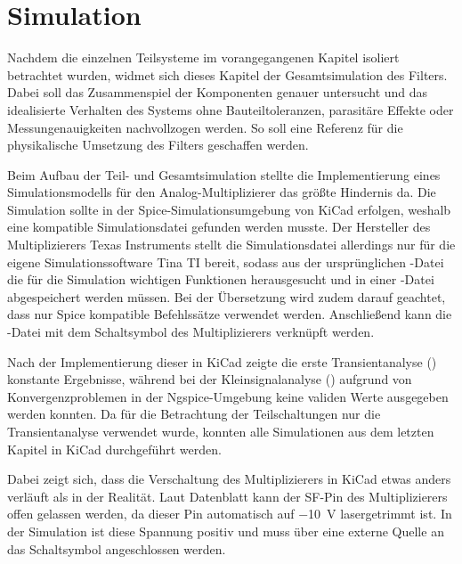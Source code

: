 \documentclass[../main_config.tex]{subfiles}
\begin{document}
\chapter{Simulation}

Nachdem die einzelnen Teilsysteme im vorangegangenen Kapitel isoliert betrachtet wurden, widmet sich dieses Kapitel der Gesamtsimulation des Filters. Dabei soll das Zusammenspiel der Komponenten genauer untersucht und das idealisierte Verhalten des Systems ohne Bauteiltoleranzen, parasitäre Effekte oder Messungenauigkeiten nachvollzogen werden. So soll eine Referenz für die physikalische Umsetzung des Filters geschaffen werden.\par
\medskip

Beim Aufbau der Teil- und Gesamtsimulation stellte die Implementierung eines Simulationsmodells für den Analog-Multiplizierer das größte Hindernis da. Die Simulation sollte in der Spice-Simulationsumgebung von KiCad erfolgen, weshalb eine kompatible Simulationsdatei gefunden werden musste. Der Hersteller des Multiplizierers Texas Instruments stellt die Simulationsdatei allerdings nur für die eigene Simulationssoftware Tina TI bereit, sodass aus der ursprünglichen -Datei die für die Simulation wichtigen Funktionen herausgesucht und in einer -Datei abgespeichert werden müssen. Bei der Übersetzung wird zudem darauf geachtet, dass nur Spice kompatible Befehlssätze verwendet werden. Anschließend kann die -Datei mit dem Schaltsymbol des Multiplizierers verknüpft werden. \cite{sim_modell_multi}\par
\medskip

Nach der Implementierung dieser in KiCad zeigte die erste Transientanalyse () konstante Ergebnisse, während bei der Kleinsignalanalyse () aufgrund von Konvergenzproblemen in der Ngspice-Umgebung keine validen Werte ausgegeben werden konnten.
Da für die Betrachtung der Teilschaltungen nur die Transientanalyse verwendet wurde, konnten alle Simulationen aus dem letzten Kapitel in KiCad durchgeführt werden. \par
\medskip

Dabei zeigt sich, dass die Verschaltung des Multiplizierers in KiCad etwas anders verläuft als in der Realität. Laut Datenblatt kann der SF-Pin des Multiplizierers offen gelassen werden, da dieser Pin automatisch auf \SI{-10}{\volt} lasergetrimmt ist. In der Simulation ist diese Spannung positiv und muss über eine externe Quelle an das Schaltsymbol angeschlossen werden. \par
\medskip
\end{document}

